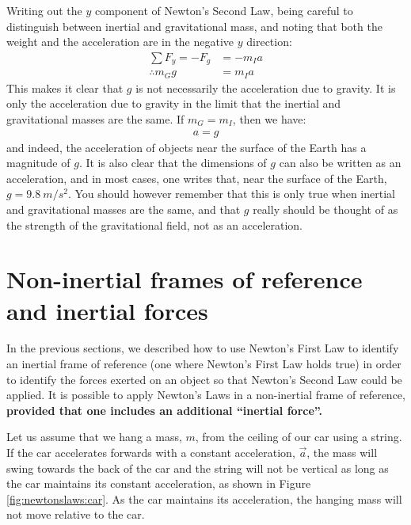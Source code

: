 Writing out the $y$ component of Newton's Second Law, being careful to distinguish between inertial and gravitational mass, and noting that both the weight and the acceleration are in the negative $y$ direction:
\begin{align*}
\sum F_y = -F_g &= -m_I a\\
\therefore m_Gg &= m_I a
\end{align*}
This makes it clear that $g$ is not necessarily the acceleration due to gravity. It is only the acceleration due to gravity in the limit that the inertial and gravitational masses are the same. If $m_G=m_I$, then we have:
\begin{align*}
a = g
\end{align*}
and indeed, the acceleration of objects near the surface of the Earth has a magnitude of $g$. It is also clear that the dimensions of $g$ can also be written as an acceleration, and in most cases, one writes that, near the surface of the Earth, $g=\SI{9.8}{m/s^2}$. You should however remember that this is only true when inertial and gravitational masses are the same, and that $g$ really should be thought of as the strength of the gravitational field, not as an acceleration.

\section{Non-inertial frames of reference and inertial forces}
\label{sec:newtonslaws:inertialforces}
In the previous sections, we described how to use Newton's First Law to identify an inertial frame of reference (one where Newton's First Law holds true) in order to identify the forces exerted on an object so that Newton's Second Law could be applied. It is possible to apply Newton's Laws in a non-inertial frame of reference, \textbf{provided that one includes an additional ``inertial force''.}

Let us assume that we hang a mass, $m$, from the ceiling of our car using a string. If the car accelerates forwards with a constant acceleration, $\vec a$, the mass will swing towards the back of the car and the string will not be vertical as long as the car maintains its constant acceleration, as shown in Figure \ref{fig:newtonslaws:car}. As the car maintains its acceleration, the hanging mass will not move relative to the car.


